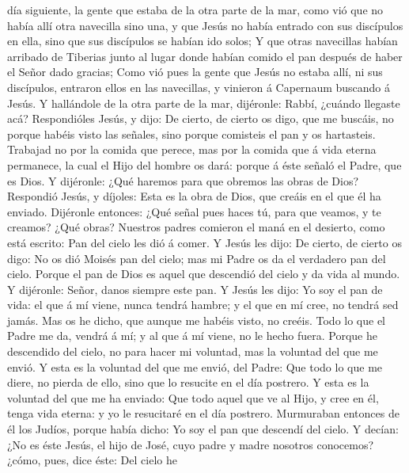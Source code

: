 día siguiente, la gente que estaba de la otra parte de la mar, como vió
que no había allí otra navecilla sino una, y que Jesús no había entrado
con sus discípulos en ella, sino que sus discípulos se habían ido solos;
 Y que otras navecillas habían arribado de Tiberias junto
al lugar donde habían comido el pan después de haber el Señor dado
gracias;  Como vió pues la gente que Jesús no estaba
allí, ni sus discípulos, entraron ellos en las navecillas, y vinieron á
Capernaum buscando á Jesús.  Y hallándole de la otra
parte de la mar, dijéronle: Rabbí, ¿cuándo llegaste acá? 
Respondióles Jesús, y dijo: De cierto, de cierto os digo, que me
buscáis, no porque habéis visto las señales, sino porque comisteis el
pan y os hartasteis.  Trabajad no por la comida que
perece, mas por la comida que á vida eterna permanece, la cual el Hijo
del hombre os dará: porque á éste señaló el Padre, que es Dios.
 Y dijéronle: ¿Qué haremos para que obremos las obras de
Dios?  Respondió Jesús, y díjoles: Esta es la obra de
Dios, que creáis en el que él ha enviado.  Dijéronle
entonces: ¿Qué señal pues haces tú, para que veamos, y te creamos? ¿Qué
obras?  Nuestros padres comieron el maná en el desierto,
como está escrito: Pan del cielo les dió á comer.  Y
Jesús les dijo: De cierto, de cierto os digo: No os dió Moisés pan del
cielo; mas mi Padre os da el verdadero pan del cielo. 
Porque el pan de Dios es aquel que descendió del cielo y da vida al
mundo.  Y dijéronle: Señor, danos siempre este pan.
 Y Jesús les dijo: Yo soy el pan de vida: el que á mí
viene, nunca tendrá hambre; y el que en mí cree, no tendrá sed jamás.
 Mas os he dicho, que aunque me habéis visto, no creéis.
 Todo lo que el Padre me da, vendrá á mí; y al que á mí
viene, no le hecho fuera.  Porque he descendido del
cielo, no para hacer mi voluntad, mas la voluntad del que me envió.
 Y esta es la voluntad del que me envió, del Padre: Que
todo lo que me diere, no pierda de ello, sino que lo resucite en el día
postrero.  Y esta es la voluntad del que me ha enviado:
Que todo aquel que ve al Hijo, y cree en él, tenga vida eterna: y yo le
resucitaré en el día postrero.  Murmuraban entonces de él
los Judíos, porque había dicho: Yo soy el pan que descendí del cielo.
 Y decían: ¿No es éste Jesús, el hijo de José, cuyo padre
y madre nosotros conocemos? ¿cómo, pues, dice éste: Del cielo he
